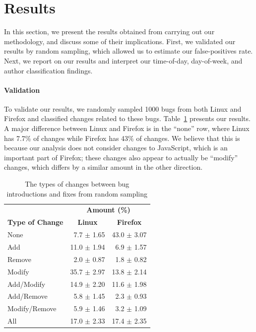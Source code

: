 \section{Results}
\label{sec-results}
In this section, we present the results obtained from carrying out our
methodology, and discuss some of their implications. First, we validated
our results by random sampling, which allowed us to estimate our
false-positives rate. Next, we report on our results and interpret
our time-of-day, day-of-week, and author classification findings.

\paragraph{Validation} 
To validate our results, we randomly sampled 1000 bugs from both Linux
and Firefox and classified changes related to these bugs.
Table~\ref{tbl-changes} presents our results. A major difference
between Linux and Firefox is in the ``none'' row, where Linux has
7.7\% of changes while Firefox has 43\% of changes. We believe that
this is because our analysis does not consider changes to JavaScript,
which is an important part of Firefox; these changes also appear to
actually be ``modify'' changes, which differs by a similar amount
in the other direction.


\begin{table}
\begin{center}
\begin{tabular}{l|r|r}
\multicolumn{1}{c}{} & \multicolumn{2}{c}{\textbf{Amount (\%)}} \\
\textbf{Type of Change} & \multicolumn{1}{c|}{\textbf{Linux}} & \multicolumn{1}{c}{\textbf{Firefox}}\\
\hline
None          &  7.7 $\pm$ 1.65 & 43.0 $\pm$ 3.07\\
\hline
Add           & 11.0 $\pm$ 1.94 & 6.9 $\pm$ 1.57\\
\hline
Remove        &  2.0 $\pm$ 0.87 & 1.8 $\pm$ 0.82\\
\hline
Modify        & 35.7 $\pm$ 2.97 & 13.8 $\pm$ 2.14\\
\hline
Add/Modify    & 14.9 $\pm$ 2.20 & 11.6 $\pm$ 1.98\\
\hline
Add/Remove    &  5.8 $\pm$ 1.45 & 2.3 $\pm$ 0.93\\
\hline
Modify/Remove &  5.9 $\pm$ 1.46 & 3.2 $\pm$ 1.09 \\
\hline
All           & 17.0 $\pm$ 2.33 & 17.4 $\pm$ 2.35\\
\end{tabular}
\end{center}
\caption{The types of changes between bug introductions and fixes from random sampling}
\label{tbl-changes}
\end{table}


